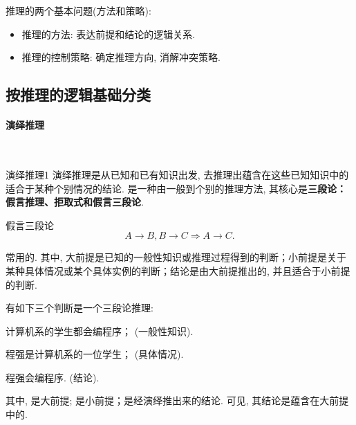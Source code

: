 推理的两个基本问题(方法和策略):
\begin{itemize}
\item 推理的方法: 表达前提和结论的逻辑关系.
\item 推理的控制策略: 确定推理方向, 消解冲突策略.
\end{itemize}
\subsection{按推理的逻辑基础分类}
\paragraph{演绎推理}~{}
\begin{mydef}{演绎推理}{1}
演绎推理是从已知和已有知识出发, 去推理出蕴含在这些已知知识中的适合于某种个别情况的结论. 是一种由一般到个别的推理方法, 其核心是\textcolor[rgb]{0,0,1}{\textbf{三段论：假言推理、拒取式和假言三段论}}.
\end{mydef}

\begin{example}
  假言三段论
$$A\rightarrow B, B\rightarrow C \Rightarrow A\rightarrow C.$$
\end{example}

常用的. 其中, 大前提是已知的一般性知识或推理过程得到的判断；小前提是关于某种具体情况或某个具体实例的判断；结论是由大前提推出的, 并且适合于小前提的判断.
\begin{example}
有如下三个判断是一个三段论推理:

      计算机系的学生都会编程序；   (一般性知识).

      程强是计算机系的一位学生；   (具体情况).

      程强会编程序.            (结论).
\end{example}
其中, 是大前提; 是小前提；是经演绎推出来的结论.
可见, 其结论是蕴含在大前提中的.
